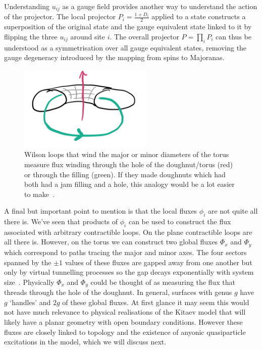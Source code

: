 Understanding \(u_{ij}\) as a gauge field provides another way to understand the action of the projector. The local projector \(P_i = \frac{1 + D_i}{2}\) applied to a state constructs a superposition of the original state and the gauge equivalent state linked to it by flipping the three \(u_{ij}\) around site \(i\). The overall projector \(P = \prod_i P_i\) can thus be understood as a symmetrisation over all gauge equivalent states, removing the gauge degeneracy introduced by the mapping from spins to Majoranas.

\hypertarget{fig:topological_fluxes}{%
\begin{figure}
\centering
\includegraphics[width=0.57\textwidth,height=\textheight]{figure_code/amk_chapter/topological_fluxes.png}
\caption[{Topological Fluxes}]{Wilson loops that wind the major or minor diameters of the torus measure flux winding through the hole of the doughnut/torus (red) or through the filling (green). If they made doughnuts which had both had a jam filling and a hole, this analogy would be a lot easier to make~\autocite{parkerWhyDoesThis}.}
\label{fig:topological_fluxes}
\end{figure}
}

A final but important point to mention is that the local fluxes \(\phi_i\) are not quite all there is. We've seen that products of \(\phi_i\) can be used to construct the flux associated with arbitrary contractible loops. On the plane contractible loops are all there is. However, on the torus we can construct two global fluxes \(\Phi_x\) and \(\Phi_y\) which correspond to paths tracing the major and minor axes. The four sectors spanned by the \(\pm1\) values of these fluxes are gapped away from one another but only by virtual tunnelling processes so the gap decays exponentially with system size~\autocite{kitaevAnyonsExactlySolved2006}. Physically \(\Phi_x\) and \(\Phi_y\) could be thought of as measuring the flux that threads through the hole of the doughnut. In general, surfaces with genus \(g\) have \(g\) `handles' and \(2g\) of these global fluxes. At first glance it may seem this would not have much relevance to physical realisations of the Kitaev model that will likely have a planar geometry with open boundary conditions. However these fluxes are closely linked to topology and the existence of anyonic quasiparticle excitations in the model, which we will discuss next.

